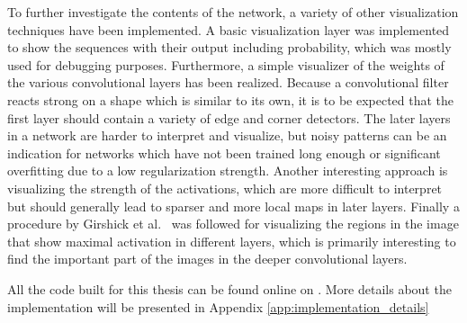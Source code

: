 To further investigate the contents of the network, a variety of other visualization techniques have been implemented. A basic visualization layer was implemented to show the sequences with their output including probability, which was mostly used for debugging purposes. Furthermore, a simple visualizer of the weights of the various convolutional layers has been realized. Because a convolutional filter reacts strong on a shape which is similar to its own, it is to be expected that the first layer should contain a variety of edge and corner detectors. The later layers in a network are harder to interpret and visualize, but noisy patterns can be an indication for networks which have not been trained long enough or significant overfitting due to a low regularization strength\needref. Another interesting approach is visualizing the strength of the activations, which are more difficult to interpret but should generally lead to sparser and more local maps in later layers. Finally a procedure by Girshick et al.~\cite{girshick2014} was followed for visualizing the regions in the image that show maximal activation in different layers, which is primarily interesting to find the important part of the images in the deeper convolutional layers.

All the code built for this thesis can be found online on \needref.  More details about the implementation will be presented in Appendix \ref{app:implementation_details}
